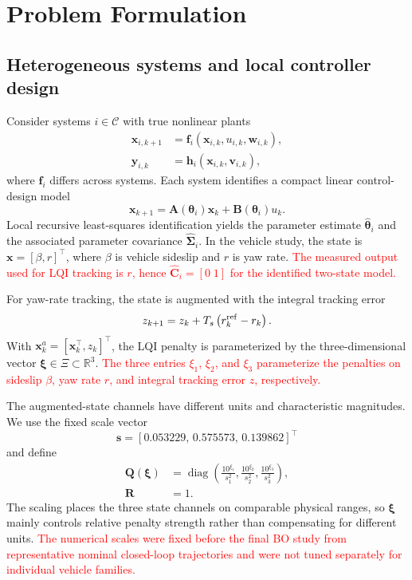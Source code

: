 \documentclass[conference]{IEEEtran}
\newcommand{\rev}[1]{\textcolor{red}{#1}}
\begin{document}
\section{Problem Formulation}

\subsection{Heterogeneous systems and local controller design}
Consider systems $i\in\mathcal C$ with true nonlinear plants
\begin{align}
 \mathbf{x}_{i,k+1}&=\mathbf{f}_i(\mathbf{x}_{i,k},u_{i,k},\mathbf{w}_{i,k}),\\
 \mathbf{y}_{i,k}&=\mathbf{h}_i(\mathbf{x}_{i,k},\mathbf{v}_{i,k}),
 \label{eq:true_plant_generic}
\end{align}
where $\mathbf{f}_i$ differs across systems. Each system identifies a compact linear control-design model
\begin{equation}
 \mathbf{x}_{k+1}=\mathbf{A}(\boldsymbol{\theta}_i)\mathbf{x}_k+\mathbf{B}(\boldsymbol{\theta}_i)u_k.
 \label{eq:identified_model}
\end{equation}
Local recursive least-squares identification yields the parameter estimate $\hat{\boldsymbol{\theta}}_i$ and the associated parameter covariance $\hat{\boldsymbol{\Sigma}}_i$. In the vehicle study, the state is $\mathbf{x}=[\beta,r]^\top$, where $\beta$ is vehicle sideslip and $r$ is yaw rate. \rev{The measured output used for LQI tracking is $r$, hence $\hat{\mathbf C}_i=[0\;1]$ for the identified two-state model.}

For yaw-rate tracking, the state is augmented with the integral tracking error
\begin{equation}
 z_{k+1}=z_k+T_s\left(r_k^{\rm ref}-r_k\right).
 \label{eq:integral_state}
\end{equation}
With $\mathbf{x}_k^a=[\mathbf{x}_k^\top,z_k]^\top$, the LQI penalty is parameterized by the three-dimensional vector $\boldsymbol{\xi}\in\Xi\subset\mathbb R^3$. \rev{The three entries $\xi_1$, $\xi_2$, and $\xi_3$ parameterize the penalties on sideslip $\beta$, yaw rate $r$, and integral tracking error $z$, respectively.}

The augmented-state channels have different units and characteristic magnitudes. We use the fixed scale vector
\begin{equation}
 \mathbf{s}=[0.053229,\,0.575573,\,0.139862]^\top
 \label{eq:state_scales}
\end{equation}
and define
\begin{align}
 \mathbf{Q}(\boldsymbol{\xi})&=\operatorname{diag}\left(\frac{10^{\xi_1}}{s_1^2},\frac{10^{\xi_2}}{s_2^2},\frac{10^{\xi_3}}{s_3^2}\right),\\
 \mathbf{R}&=1.
 \label{eq:lqi_weights}
\end{align}
The scaling places the three state channels on comparable physical ranges, so $\boldsymbol{\xi}$ mainly controls relative penalty strength rather than compensating for different units. \rev{The numerical scales were fixed before the final BO study from representative nominal closed-loop trajectories and were not tuned separately for individual vehicle families.}
\end{document}
